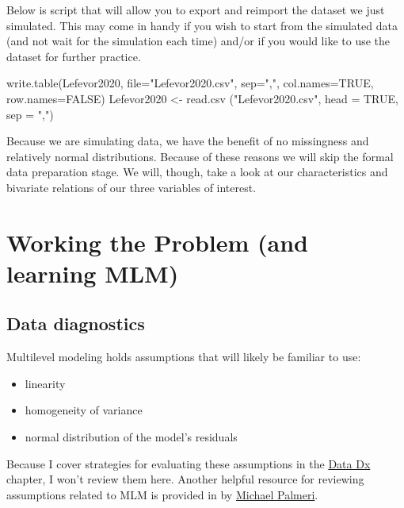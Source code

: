 \documentclass[
  11pt,
]{book}
\newenvironment{Shaded}{\begin{snugshade}}{\end{snugshade}}
\newcommand{\AttributeTok}[1]{\textcolor[rgb]{0.77,0.63,0.00}{#1}}
\newcommand{\ConstantTok}[1]{\textcolor[rgb]{0.00,0.00,0.00}{#1}}
\newcommand{\FunctionTok}[1]{\textcolor[rgb]{0.00,0.00,0.00}{#1}}
\newcommand{\NormalTok}[1]{#1}
\newcommand{\OtherTok}[1]{\textcolor[rgb]{0.56,0.35,0.01}{#1}}
\newcommand{\StringTok}[1]{\textcolor[rgb]{0.31,0.60,0.02}{#1}}
\providecommand{\tightlist}{%
  \setlength{\itemsep}{0pt}\setlength{\parskip}{0pt}}
\begin{document}
Below is script that will allow you to export and reimport the dataset we just simulated. This may come in handy if you wish to start from the simulated data (and not wait for the simulation each time) and/or if you would like to use the dataset for further practice.

\begin{Shaded}
\begin{Highlighting}[]
\FunctionTok{write.table}\NormalTok{(Lefevor2020, }\AttributeTok{file=}\StringTok{"Lefevor2020.csv"}\NormalTok{, }\AttributeTok{sep=}\StringTok{","}\NormalTok{, }\AttributeTok{col.names=}\ConstantTok{TRUE}\NormalTok{, }\AttributeTok{row.names=}\ConstantTok{FALSE}\NormalTok{)}
\NormalTok{Lefevor2020 }\OtherTok{\textless{}{-}} \FunctionTok{read.csv}\NormalTok{ (}\StringTok{"Lefevor2020.csv"}\NormalTok{, }\AttributeTok{head =} \ConstantTok{TRUE}\NormalTok{, }\AttributeTok{sep =} \StringTok{","}\NormalTok{)}
\end{Highlighting}
\end{Shaded}

Because we are simulating data, we have the benefit of no missingness and relatively normal distributions. Because of these reasons we will skip the formal data preparation stage. We will, though, take a look at our characteristics and bivariate relations of our three variables of interest.

\hypertarget{working-the-problem-and-learning-mlm}{%
\section{Working the Problem (and learning MLM)}\label{working-the-problem-and-learning-mlm}}

\hypertarget{data-diagnostics}{%
\subsection{Data diagnostics}\label{data-diagnostics}}

Multilevel modeling holds assumptions that will likely be familiar to use:

\begin{itemize}
\tightlist
\item
  linearity
\item
  homogeneity of variance
\item
  normal distribution of the model's residuals
\end{itemize}

Because I cover strategies for evaluating these assumptions in the \href{https://lhbikos.github.io/ReC_MultivModel/DataDx.html}{Data Dx} chapter, I won't review them here. Another helpful resource for reviewing assumptions related to MLM is provided in by \href{https://ademos.people.uic.edu/Chapter18.html\#6_assumptions}{Michael Palmeri}.
\end{document}
